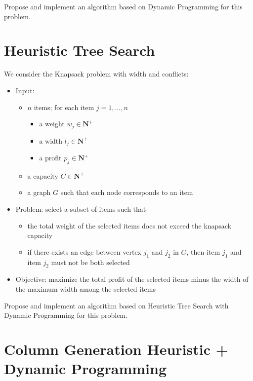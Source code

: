 \documentclass[a4paper]{article}
\newcommand{\N}{\mathbf{N}}
\begin{document}
Propose and implement an algorithm based on Dynamic Programming for this problem.

\section{Heuristic Tree Search}

We consider the Knapsack problem with width and conflicts:
\begin{itemize}
  \item Input:
    \begin{itemize}
      \item $n$ items; for each item $j = 1, \dots, n$
        \begin{itemize}
          \item a weight $w_j \in \N^+$
          \item a width $l_j \in \N^+$
          \item a profit $p_j \in \N^+$
        \end{itemize}
      \item a capacity $C \in \N^+$
      \item a graph $G$ such that each node corresponds to an item
    \end{itemize}
  \item Problem: select a subset of items such that
    \begin{itemize}
      \item the total weight of the selected items does not exceed the knapsack capacity
      \item if there exists an edge between vertex $j_1$ and $j_2$ in $G$, then item $j_1$ and item $j_2$ must not be both selected
    \end{itemize}
  \item Objective: maximize the total profit of the selected items minus the width of the maximum width among the selected items
\end{itemize}

Propose and implement an algorithm based on Heuristic Tree Search with Dynamic Programming for this problem.

\section{Column Generation Heuristic + Dynamic Programming}
\end{document}
